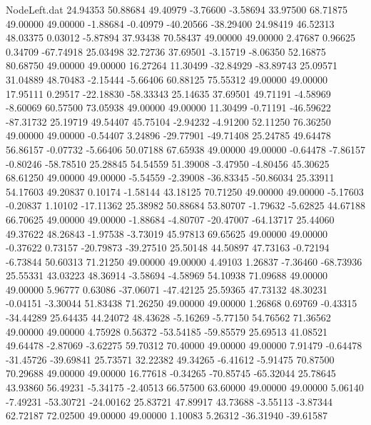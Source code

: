 \begin{filecontents}{NodeLeft.dat}
  24.94353   50.88684   49.40979    -3.76600   -3.58694   33.97500   68.71875   49.00000   49.00000   -1.88684   -0.40979  -40.20566  -38.29400
  24.98419   46.52313   48.03375     0.03012   -5.87894   37.93438   70.58437   49.00000   49.00000    2.47687    0.96625    0.34709  -67.74918
  25.03498   32.72736   37.69501    -3.15719   -8.06350   52.16875   80.68750   49.00000   49.00000   16.27264   11.30499  -32.84929  -83.89743
  25.09571   31.04889   48.70483    -2.15444   -5.66406   60.88125   75.55312   49.00000   49.00000   17.95111    0.29517  -22.18830  -58.33343
  25.14635   37.69501   49.71191    -4.58969   -8.60069   60.57500   73.05938   49.00000   49.00000   11.30499   -0.71191  -46.59622  -87.31732
  25.19719   49.54407   45.75104    -2.94232   -4.91200   52.11250   76.36250   49.00000   49.00000   -0.54407    3.24896  -29.77901  -49.71408
  25.24785   49.64478   56.86157    -0.07732   -5.66406   50.07188   67.65938   49.00000   49.00000   -0.64478   -7.86157   -0.80246  -58.78510
  25.28845   54.54559   51.39008    -3.47950   -4.80456   45.30625   68.61250   49.00000   49.00000   -5.54559   -2.39008  -36.83345  -50.86034
  25.33911   54.17603   49.20837     0.10174   -1.58144   43.18125   70.71250   49.00000   49.00000   -5.17603   -0.20837    1.10102  -17.11362
  25.38982   50.88684   53.80707    -1.79632   -5.62825   44.67188   66.70625   49.00000   49.00000   -1.88684   -4.80707  -20.47007  -64.13717
  25.44060   49.37622   48.26843    -1.97538   -3.73019   45.97813   69.65625   49.00000   49.00000   -0.37622    0.73157  -20.79873  -39.27510
  25.50148   44.50897   47.73163    -0.72194   -6.73844   50.60313   71.21250   49.00000   49.00000    4.49103    1.26837   -7.36460  -68.73936
  25.55331   43.03223   48.36914    -3.58694   -4.58969   54.10938   71.09688   49.00000   49.00000    5.96777    0.63086  -37.06071  -47.42125
  25.59365   47.73132   48.30231    -0.04151   -3.30044   51.83438   71.26250   49.00000   49.00000    1.26868    0.69769   -0.43315  -34.44289
  25.64435   44.24072   48.43628    -5.16269   -5.77150   54.76562   71.36562   49.00000   49.00000    4.75928    0.56372  -53.54185  -59.85579
  25.69513   41.08521   49.64478    -2.87069   -3.62275   59.70312   70.40000   49.00000   49.00000    7.91479   -0.64478  -31.45726  -39.69841
  25.73571   32.22382   49.34265    -6.41612   -5.91475   70.87500   70.29688   49.00000   49.00000   16.77618   -0.34265  -70.85745  -65.32044
  25.78645   43.93860   56.49231    -5.34175   -2.40513   66.57500   63.60000   49.00000   49.00000    5.06140   -7.49231  -53.30721  -24.00162
  25.83721   47.89917   43.73688    -3.55113   -3.87344   62.72187   72.02500   49.00000   49.00000    1.10083    5.26312  -36.31940  -39.61587

\end{filecontents}
